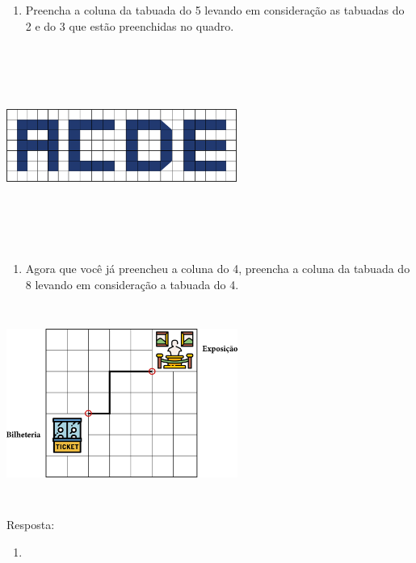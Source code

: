\begin{enumerate}
\def\labelenumi{\alph{enumi})}
\item
  Preencha a coluna da tabuada do 5 levando em consideração as tabuadas
  do 2 e do 3 que estão preenchidas no quadro.
\end{enumerate}

\includegraphics[width=2.96667in,height=2.58563in]{media/image34.png}

\begin{enumerate}
\def\labelenumi{\alph{enumi})}
\item
  Agora que você já preencheu a coluna do 4, preencha a coluna da
  tabuada do 8 levando em consideração a tabuada do 4.
\end{enumerate}

\includegraphics[width=2.98333in,height=2.55714in]{media/image35.png}

Resposta:

\begin{enumerate}
\def\labelenumi{\alph{enumi})}
\item
\end{enumerate}

